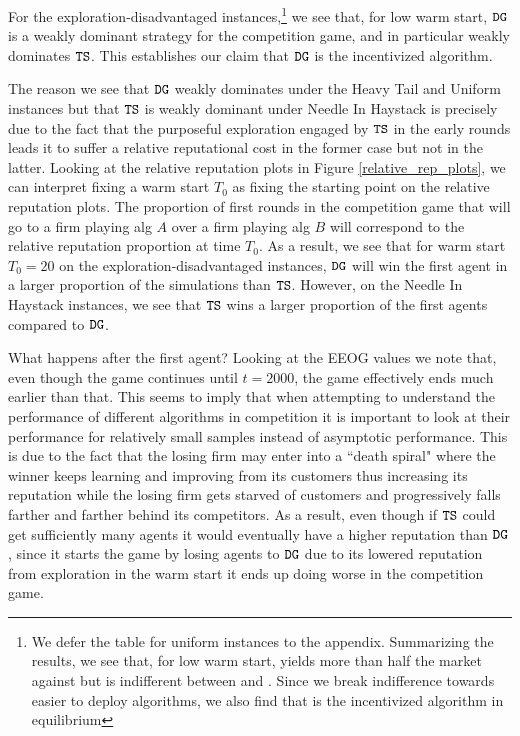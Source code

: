 \documentclass[../competing_bandits.tex]{subfiles}
\begin{document}
For the exploration-disadvantaged instances,\footnote{We defer the table for uniform instances to the appendix. Summarizing the results, we see that, for low warm start, \DG yields more than half the market against \TS but is indifferent between \DG and \DEG. Since we break indifference towards easier to deploy algorithms, we also find that \DG is the incentivized algorithm in equilibrium} we see that, for low warm start, $\mathtt{DG}$ is a weakly dominant strategy for the competition game, and in particular weakly dominates $\mathtt{TS}$. This establishes our claim that $\mathtt{DG}$ is the incentivized algorithm.

The reason we see that $\mathtt{DG}$ weakly dominates under the Heavy Tail and Uniform instances but that $\mathtt{TS}$ is weakly dominant under Needle In Haystack is precisely due to the fact that the purposeful exploration engaged by $\mathtt{TS}$ in the early rounds leads it to suffer a relative reputational cost in the former case but not in the latter. Looking at the relative reputation plots in Figure \ref{relative_rep_plots}, we can interpret fixing a warm start $T_0$ as fixing the starting point on the relative reputation plots. The proportion of first rounds in the competition game that will go to a firm playing alg $A$ over a firm playing alg $B$ will correspond to the relative reputation proportion at time $T_0$. As a result, we see that for warm start $T_0 = 20$ on the exploration-disadvantaged instances, $\mathtt{DG}$ will win the first agent in a larger proportion of the simulations than $\mathtt{TS}$. However, on the Needle In Haystack instances, we see that $\mathtt{TS}$ wins a larger proportion of the first agents compared to $\mathtt{DG}$.

What happens after the first agent? Looking at the EEOG values we note that, even though the game continues until $t=2000$, the game effectively ends much earlier than that. This seems to imply that when attempting to understand the performance of different algorithms in competition it is important to look at their performance for relatively small samples instead of asymptotic performance. This is due to the fact that the losing firm may enter into a ``death spiral" where the winner keeps learning and improving from its customers thus increasing its reputation while the losing firm gets starved of customers and progressively falls farther and farther behind its competitors. As a result, even though if $\mathtt{TS}$ could get sufficiently many agents it would eventually have a higher reputation than $\mathtt{DG}$, since it starts the game by losing agents to $\mathtt{DG}$ due to its lowered reputation from exploration in the warm start it ends up doing worse in the competition game.
\end{document}

